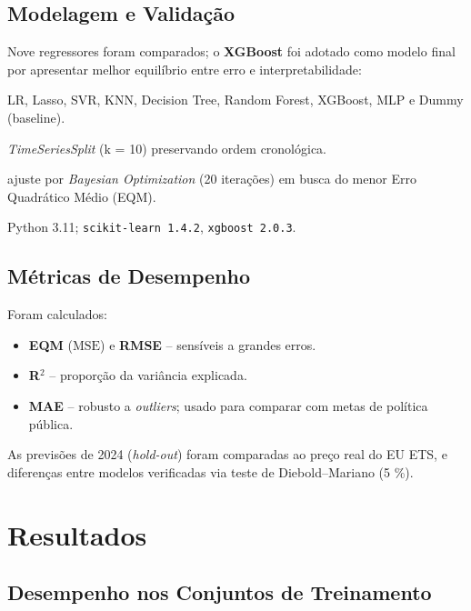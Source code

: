 \documentclass[conference]{IEEEtran}
\begin{document}
\subsection{Modelagem e Validação}

Nove regressores foram comparados; o \textbf{XGBoost} foi adotado como modelo final por apresentar melhor equilíbrio entre erro e interpretabilidade:

\begin{description}[leftmargin=*]
  \item[Algoritmos testados:] LR, Lasso, SVR, KNN, Decision Tree, Random Forest, XGBoost, MLP e Dummy (baseline).
  \item[Validação:] \emph{TimeSeriesSplit} (k = 10) preservando ordem cronológica.
  \item[Hiperparâmetros:] ajuste por \emph{Bayesian Optimization} (20 iterações) em busca do menor Erro Quadrático Médio (EQM).
  \item[Ambiente:] Python 3.11; \texttt{scikit-learn 1.4.2}, \texttt{xgboost 2.0.3}.
\end{description}

\subsection{Métricas de Desempenho}

Foram calculados:

\begin{itemize}[leftmargin=*]
  \item \textbf{EQM} (\(\text{MSE}\)) e \textbf{RMSE} – sensíveis a grandes erros.
  \item \textbf{R\(^2\)} – proporção da variância explicada.
  \item \textbf{MAE} – robusto a \emph{outliers}; usado para comparar com metas de política pública.
\end{itemize}

As previsões de 2024 (\emph{hold-out}) foram comparadas ao preço real do EU ETS, e diferenças entre modelos verificadas via teste de Diebold–Mariano (5 \%).


\section{Resultados}\label{sec:resultados}

\subsection{Desempenho nos Conjuntos de Treinamento}
\end{document}

